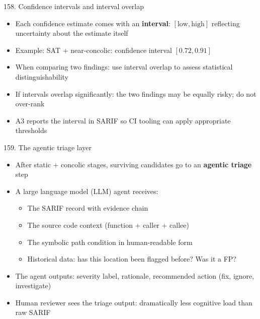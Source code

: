 \documentclass[aspectratio=169]{beamer}
\begin{document}
\begin{frame}{158. Confidence intervals and interval overlap}
\begin{itemize}
  \item Each confidence estimate comes with an \textbf{interval}: \([\text{low}, \text{high}]\) reflecting uncertainty about the estimate itself
  \item Example: SAT + near-concolic: confidence interval \([0.72, 0.91]\)
  \item When comparing two findings: use interval overlap to assess statistical distinguishability
  \item If intervals overlap significantly: the two findings may be equally risky; do not over-rank
  \item A3 reports the interval in SARIF so CI tooling can apply appropriate thresholds
\end{itemize}
\end{frame}

\begin{frame}{159. The agentic triage layer}
\begin{itemize}
  \item After static + concolic stages, surviving candidates go to an \textbf{agentic triage} step
  \item A large language model (LLM) agent receives:
    \begin{itemize}
      \item The SARIF record with evidence chain
      \item The source code context (function + caller + callee)
      \item The symbolic path condition in human-readable form
      \item Historical data: has this location been flagged before? Was it a FP?
    \end{itemize}
  \item The agent outputs: severity label, rationale, recommended action (fix, ignore, investigate)
  \item Human reviewer sees the triage output: dramatically less cognitive load than raw SARIF
\end{itemize}
\end{frame}
\end{document}
